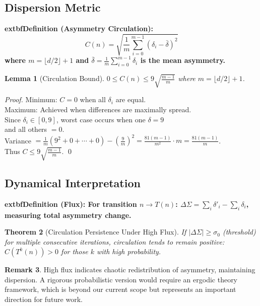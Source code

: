 \documentclass[11pt,a4paper]{article}
\theoremstyle{plain}
\newtheorem{theorem}{Theorem}[section]
\newtheorem{lemma}[theorem]{Lemma}
\theoremstyle{definition}
\newtheorem{remark}[theorem]{Remark}
\newenvironment{definitionbox}
    {\begin{center}\begin{minipage}{0.95\textwidth}\color{blue}\bfseries}
    {\end{minipage}\end{center}}
\begin{document}
\subsection{Dispersion Metric}

\begin{definitionbox}
	extbf{Definition (Asymmetry Circulation):}
\[C(n) = \sqrt{\frac{1}{m}\sum_{i=0}^{m-1} (\delta_i - \bar{\delta})^2}\]
where $m = \lfloor d/2 \rfloor + 1$ and $\bar{\delta} = \frac{1}{m}\sum_{i=0}^{m-1} \delta_i$ is the mean asymmetry.
\end{definitionbox}

\begin{lemma}[Circulation Bound]\label{lem:circ_bound}
$0 \leq C(n) \leq 9\sqrt{\frac{m-1}{m}}$ where $m = \lfloor d/2 \rfloor + 1$.
\end{lemma}

\begin{proof}
Minimum: $C = 0$ when all $\delta_i$ are equal.\\
Maximum: Achieved when differences are maximally spread. \\
Since $\delta_i \in [0,9]$, worst case occurs when one $\delta = 9$ \\
and all others $= 0$.\\
Variance $= \frac{1}{m}(9^2 + 0 + \cdots + 0) - \left(\frac{9}{m}\right)^2 = \frac{81(m-1)}{m^2} \cdot m = \frac{81(m-1)}{m}$.\\
Thus $C \leq 9\sqrt{\frac{m-1}{m}}$. \qed
\end{proof}

\subsection{Dynamical Interpretation}

\begin{definitionbox}
	extbf{Definition (Flux):}
For transition $n \to T(n)$: $\Delta\Sigma = \sum_i \delta'_i - \sum_i \delta_i$, measuring total asymmetry change.
\end{definitionbox}

\begin{theorem}[Circulation Persistence Under High Flux]\label{thm:circ_persist}
If $|\Delta\Sigma| \geq \sigma_0$ (threshold) for multiple consecutive iterations, circulation tends to remain positive: $C(T^k(n)) > 0$ for those $k$ with high probability.
\end{theorem}

\begin{remark}
High flux indicates chaotic redistribution of asymmetry, maintaining dispersion. A rigorous probabilistic version would require an ergodic theory framework, which is beyond our current scope but represents an important direction for future work.
\end{remark}
%
%
\end{document}
